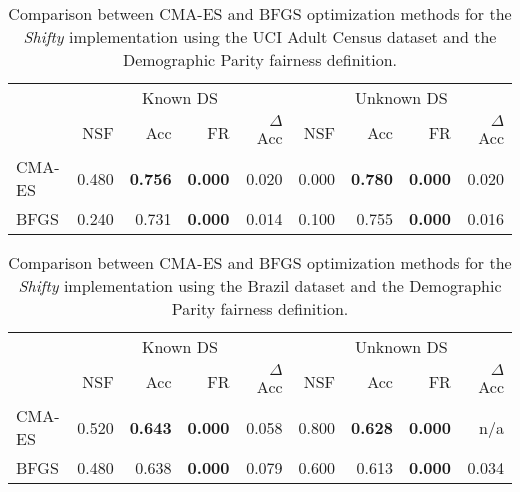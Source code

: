 \begin{table}[H]
\centering
\label{dp_adult_optimizer}
\begin{tabular}{lrrrrrrrr}
\toprule
 & \multicolumn{4}{c}{Known DS} & \multicolumn{4}{c}{Unknown DS} \\
 & NSF & Acc & FR & $\Delta$ Acc & NSF & Acc & FR & $\Delta$ Acc \\
\cmidrule(r){2-5} \cmidrule{6-9}
CMA-ES & 0.480 & \bfseries 0.756 & \bfseries 0.000 & 0.020 & 0.000 & \bfseries 0.780 & \bfseries 0.000 & 0.020 \\
BFGS & 0.240 & 0.731 & \bfseries 0.000 & 0.014 & 0.100 & 0.755 & \bfseries 0.000 & 0.016 \\
\bottomrule
\end{tabular}
\caption{Comparison between CMA-ES and BFGS optimization methods for the \textit{Shifty} implementation using the UCI Adult Census dataset and the Demographic Parity fairness definition.}
\end{table}
 
\begin{table}[H]
\centering
\label{dp_brazil_optimizer}
\begin{tabular}{lrrrrrrrr}
\toprule
 & \multicolumn{4}{c}{Known DS} & \multicolumn{4}{c}{Unknown DS} \\
 & NSF & Acc & FR & $\Delta$ Acc & NSF & Acc & FR & $\Delta$ Acc \\
\cmidrule(r){2-5} \cmidrule{6-9}
CMA-ES & 0.520 & \bfseries 0.643 & \bfseries 0.000 & 0.058 & 0.800 & \bfseries 0.628 & \bfseries 0.000 & n/a \\
BFGS & 0.480 & 0.638 & \bfseries 0.000 & 0.079 & 0.600 & 0.613 & \bfseries 0.000 & 0.034 \\
\bottomrule
\end{tabular}
\caption{Comparison between CMA-ES and BFGS optimization methods for the \textit{Shifty} implementation using the Brazil dataset and the Demographic Parity fairness definition.}
\end{table}
